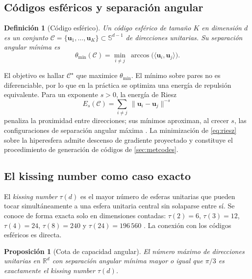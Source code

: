 \documentclass[11pt,a4paper]{article}
\theoremstyle{plain}
\newtheorem{proposition}{Proposición}
\newtheorem{definition}{Definición}
\newcommand{\Sph}{\mathbb{S}}
\newcommand{\Rset}{\mathbb{R}}
\begin{document}
\subsection{Códigos esféricos y separación angular}
\label{sec:theory:codes}

\begin{definition}[Código esférico]
Un código esférico de tamaño $K$ en dimensión $d$ es un conjunto
$\mathcal{C}=\{\bm{u}_1,\dots,\bm{u}_K\}\subset\Sph^{d-1}$ de
direcciones unitarias. Su separación angular mínima es
\begin{equation}
\theta_{\min}(\mathcal{C})
  = \min_{i\neq j}\ \arccos\!\big(\langle \bm{u}_i,\bm{u}_j\rangle\big).
\end{equation}
\end{definition}

El objetivo es hallar $\mathcal{C}^\star$ que maximice
$\theta_{\min}$. El mínimo sobre pares no es diferenciable, por lo que en
la práctica se optimiza una energía de repulsión equivalente. Para un
exponente $s>0$, la energía de Riesz
\begin{equation}
E_s(\mathcal{C})
  = \sum_{i\neq j}\ \lVert \bm{u}_i-\bm{u}_j\rVert^{-s}
\label{eq:riesz}
\end{equation}
penaliza la proximidad entre direcciones; sus mínimos aproximan, al
crecer $s$, las configuraciones de separación angular máxima
\cite{saff1997}. La minimización de \cref{eq:riesz} sobre la hiperesfera
admite descenso de gradiente proyectado y constituye el procedimiento de
generación de códigos de \cref{sec:metcodes}.

\subsection{El kissing number como caso exacto}
\label{sec:theory:kissing}

El \emph{kissing number} $\tau(d)$ es el mayor número de esferas
unitarias que pueden tocar simultáneamente a una esfera unitaria central
sin solaparse entre sí. Se conoce de forma exacta solo en dimensiones
contadas: $\tau(2)=6$, $\tau(3)=12$, $\tau(4)=24$, $\tau(8)=240$ y
$\tau(24)=196\,560$ \cite{conway1999}. La conexión con los códigos
esféricos es directa.

\begin{proposition}[Cota de capacidad angular]
\label{prop:kissing}
El número máximo de direcciones unitarias en $\Rset^d$ con separación
angular mínima mayor o igual que $\pi/3$ es exactamente el kissing
number $\tau(d)$.
\end{proposition}
\end{document}

